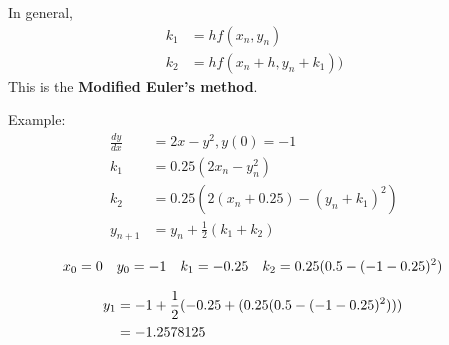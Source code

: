 		In general,
		\begin{align}
			k_{1} &= hf(x_{n}, y_{n})& \\
			k_{2} &= hf(x_{n}+h, y_{n} + k_{1}))&
		\end{align}
		This is the \textbf{Modified Euler's method}.

		Example:
		\begin{align}
			\frac{dy}{dx} &= 2x - y^{2}, y(0) = -1& \\
			k_{1} &= 0.25(2x_{n} - y_{n}^{2})& \\
			k_{2} &= 0.25(2(x_{n}+0.25)-(y_{n}+k_{1})^{2})& \\
			y_{n+1} &= y_{n} + \frac{1}{2}(k_{1}+k_{2})&
		\end{align}

		\begin{align}
			&x_{0}=0& &y_{0} = -1& &k_{1} = -0.25& &k_{2} = 0.25(0.5 - (-1 -0.25)^{2})& \notag
		\end{align}

		\begin{align}
			y_{1} &= -1 + \frac{1}{2}( - 0.25 + ( 0.25(0.5 - (-1 -0.25)^{2}) ) )& \notag \\
			&= -1.2578125&
		\end{align}
